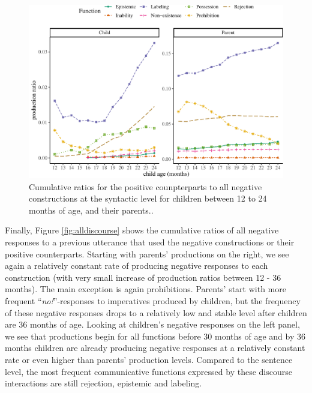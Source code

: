 \documentclass[
  english,
  man,floatsintext]{apa6}
\begin{document}
\begin{figure}[H]

{\centering \includegraphics{neg_construction_article_files/figure-latex/allposbegin-1} 

}

\caption{Cumulative ratios for the positive counpterparts to all negative constructions at the syntactic level for children between 12 to 24 months of age, and their parents..}\label{fig:allposbegin}
\end{figure}

Finally, Figure \ref{fig:alldiscourse} shows the cumulative ratios of all negative responses to a previous utterance that used the negative constructions or their positive counterparts. Starting with parents' productions on the right, we see again a relatively constant rate of producing negative responses to each construction (with very small increase of production ratios between 12 - 36 months). The main exception is again prohibitions. Parents' start with more frequent ``\emph{no!}''-responses to imperatives produced by children, but the frequency of these negative responses drops to a relatively low and stable level after children are 36 months of age. Looking at children's negative responses on the left panel, we see that productions begin for all functions before 30 months of age and by 36 months children are already producing negative responses at a relatively constant rate or even higher than parents' production levels. Compared to the sentence level, the most frequent communicative functions expressed by these discourse interactions are still rejection, epistemic and labeling.
\end{document}
